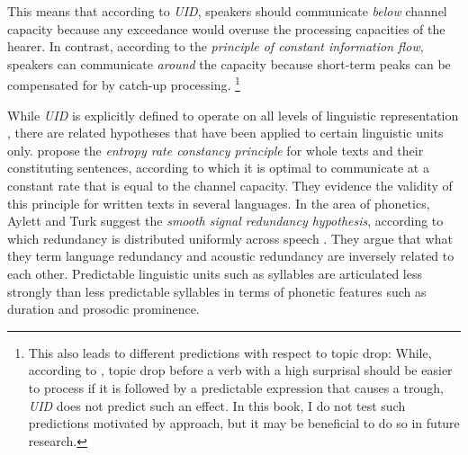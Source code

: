 This means that according to \textit{UID}, speakers should communicate \textit{below} channel capacity  because any exceedance would overuse the processing capacities of the hearer.
In contrast, according to the \textit{principle of constant information flow}, speakers can communicate \textit{around} the capacity because short-term peaks can be compensated for by catch-up processing.%
\footnote{This also leads to different predictions with respect to topic drop:
While, according to \citet{fenk.fenk1980}, topic drop before a verb with a high surprisal should be easier to process if it is followed by a predictable  expression that causes a trough, \textit{UID} does not predict such an effect.
In this book, I do not test such predictions motivated by  approach, but it may be beneficial to do so in future research.}
%

While \textit{UID} is explicitly defined to operate on all levels of linguistic representation \citep[24]{jaeger2010}, there are related hypotheses that have been applied to certain linguistic units only.
\citet{genzel.charniak2002, genzel.charniak2003} propose the \textit{entropy rate constancy principle} for whole texts and their constituting sentences, according to which it is optimal to communicate at a constant rate that is equal to the channel capacity.  
They evidence the validity of this principle for written texts in several languages.
In the area of phonetics, Aylett and Turk suggest the \textit{smooth signal redundancy hypothesis}, according to which redundancy is distributed uniformly across speech \citep{aylett.turk2004, turk2010}.
They argue that what they term language redundancy and acoustic redundancy are inversely related to each other.
Predictable  linguistic units such as syllables are articulated less strongly than less predictable syllables in terms of phonetic features such as duration and prosodic prominence. 

